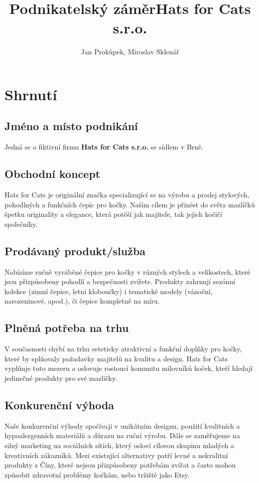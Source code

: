 \documentclass[12pt, a4paper]{article}
\begin{document}
\nocite{csob-podnikatelsky-plan}
\author{Jan Prokůpek, Miroslav Sklenář}
\title{\textbf{Podnikatelský záměr}\break Hats for Cats s.r.o.}
\date{}

\maketitle

\pagebreak

\tableofcontents

\pagebreak

\section{Shrnutí}

\subsection{Jméno a místo podnikání}
Jedná se o fiktivní firmu \textbf{Hats for Cats s.r.o.} se sídlem v Brně.

\subsection{Obchodní koncept}
Hats for Cats je originální značka specializující se na výrobu a prodej stylových, pohodlných a funkčních čepic pro kočky. 
Naším cílem je přinést do světa mazlíčků špetku originality a elegance, která potěší jak majitele, tak jejich kočičí společníky.

\subsection{Prodávaný produkt/služba}
Nabízíme ručně vyráběné čepice pro kočky v různých stylech a velikostech, 
které jsou přizpůsobeny pohodlí a bezpečnosti zvířete. 
Produkty zahrnují sezónní kolekce (zimní čepice, letní kloboučky) i tematické modely (vánoční, narozeninové, apod.),
či čepice kompletně na míru.

\subsection{Plněná potřeba na trhu}
V současnosti chybí na trhu esteticky atraktivní a funkční doplňky pro kočky, které by splňovaly požadavky majitelů na kvalitu a design. Hats for Cats vyplňuje tuto mezeru a oslovuje rostoucí komunitu milovníků koček, kteří hledají jedinečné produkty pro své mazlíčky.

\subsection{Konkurenční výhoda}
Naše konkurenční výhody spočívají v unikátním designu, použití kvalitních a hypoalergenních materiálů a důrazu na ruční výrobu. Dále se zaměřujeme na silný marketing na sociálních sítích, který osloví cílovou skupinu mladých a kreativních zákazníků.
Mezi existující alternativy patří levné a nekvalitní produkty z Číny, které nejsou přizpůsobeny potřebám zvířat a často mohou
způsobit zdravotní problémy kočkám, nebo tržiště jako Etsy.
\end{document}
